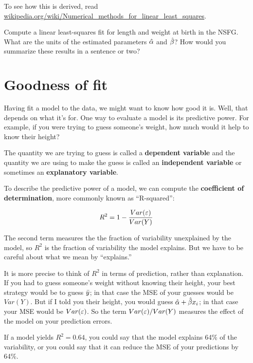 \documentclass[12pt]{book}
\begin{document}
To see how this is derived, read
\url{wikipedia.org/wiki/Numerical_methods_for_linear_least_squares}.

\begin{ex}

Compute a linear least-squares fit for length and weight at birth
in the NSFG.  What are the units of the estimated parameters
$\hat{\alpha}$ and $\hat{\beta}$?  How would you summarize these results
in a sentence or two?

\end{ex}


\section{Goodness of fit}

Having fit a model to the data, we might want to know how good
it is.  Well, that depends on what it's for.  One way to evaluate a model
is its predictive power.  For example, if you were trying to guess
someone's weight, how much would it help to know their height?

The quantity we are trying to guess is
called a {\bf dependent variable} and the quantity we are using
to make the guess is called an {\bf independent variable} or sometimes
an {\bf explanatory variable}.

To describe the predictive power of a model, we can compute the {\bf
  coefficient of determination}, more commonly known as ``R-squared'':

\[ R^2 = 1 - \frac{Var(\varepsilon)}{Var(Y)}\]

The second term measures the the fraction of variability unexplained
by the model, so $R^2$ is the fraction of variability the model
explains.  But we have to be careful about what we mean by
``explains.''

It is more precise to think of $R^2$ in terms of prediction, rather
than explanation.  If you had to guess someone's weight without
knowing their height, your best strategy would be to guess $\bar{y}$; in
that case the MSE of your guesses would be $Var(Y)$.  But if I told
you their height, you would guess $\hat{\alpha} + \hat{\beta} x_i$;
in that case your MSE would be $Var(\varepsilon)$.  So the term
$Var(\varepsilon)/Var(Y)$ measures the effect of the model on your prediction
errors.

If a model yields $R^2 = 0.64$, you could say that the model explains
64\% of the variability, or you could say that it can reduce the MSE
of your predictions by 64\%.
\end{document}
